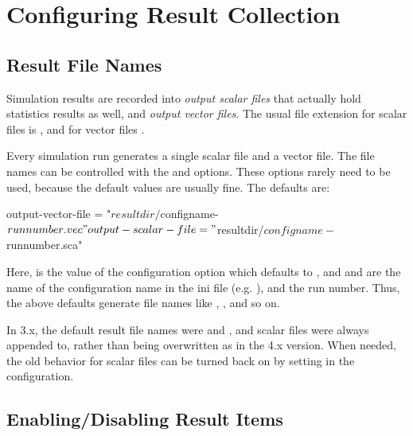 \section{Configuring Result Collection}
\label{sec:ana-sim:config-results}

\subsection{Result File Names}
\label{sec:ana-sim:result-file-names}

Simulation results are recorded into \textit{output scalar files} that
actually hold statistics results as well, and \textit{output vector
files}. The usual file extension for scalar files is , and
for vector files .

Every simulation run generates a single scalar file and a vector file.
The file names can be controlled with the 
and  options. These options rarely need
to be used, because the default values are usually fine. The defaults
are:

\begin{inifile}
output-vector-file = "${resultdir}/${configname}-${runnumber}.vec"
output-scalar-file = "${resultdir}/${configname}-${runnumber}.sca"
\end{inifile}

Here,  is the value of the 
configuration option which defaults to , and
 and  are the name of
the configuration name in the ini file (e.g. ),
and the run number. Thus, the above defaults generate file names
like , ,
and so on.

\begin{note}
  In {\opp} 3.x, the default result file names were  and
  , and scalar files were always appended to, rather than
  being overwritten as in the 4.x version. When needed, the old behavior
  for scalar files can be turned back on by setting
   in the configuration.
\end{note}


\subsection{Enabling/Disabling Result Items}
\label{sec:ana-sim:disabling-result-items}

